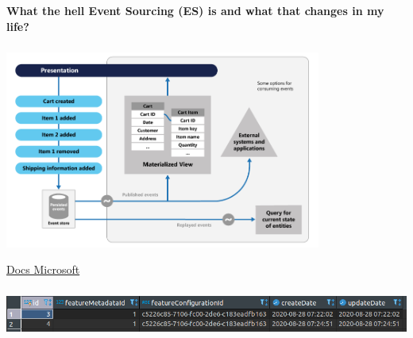 \documentclass{beamer}
\newcommand{\source}[2]{
    \begin{flushright}
        \hfill {\scriptsize \href{#1}{#2}}
    \end{flushright}
}
\begin{document}
\centering


\begin{frame}
\frametitle{\textbf{}}

    \vskip 3mm
    \vskip 3mm

\end{frame}


\begin{frame}
    \frametitle{\textbf{}}
    
    \textbf{
        \Large{What the hell Event Sourcing (ES) is and what that changes in my life?}
    }
    
\end{frame}


\begin{frame}

    \frametitle{\textbf{}}
    \includegraphics[height=65mm]{es_basic.png}
    \source{https://docs.microsoft.com/pl-pl/azure/architecture/patterns/event-sourcing}{Docs Microsoft}

\end{frame}


\begin{frame}

    \frametitle{\textbf{}}
    \includegraphics[width=\textwidth]{table.png}

\end{frame}
\end{document}
